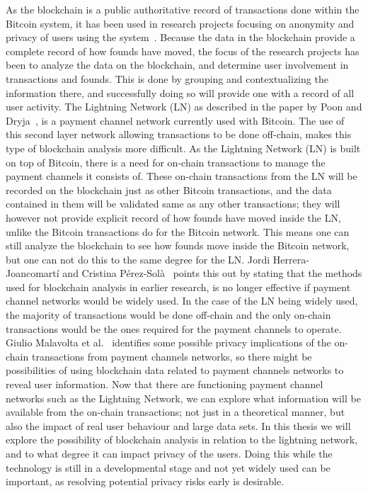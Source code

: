 As the blockchain is a public authoritative record of transactions done within the Bitcoin system, it has been used in research projects focusing on anonymity and privacy of users using the system~\cite{reid2013analysis,meiklejohn2013fistful}. Because the data in the blockchain provide a complete record of how founds have moved, the focus of the research projects has been to analyze the data on the blockchain, and determine user involvement in transactions and founds. This is done by grouping and contextualizing the information there, and successfully doing so will provide one with a record of all user activity. 
The Lightning Network (LN) as described in the paper by Poon and Dryja~\cite{poon2015bitcoin}, is a payment channel network currently used with Bitcoin. The use of this second layer network allowing transactions to be done off-chain, makes this type of blockchain analysis more difficult. As the Lightning Network (LN) is built on top of Bitcoin, there is a need for on-chain transactions to manage the payment channels it consists of. These on-chain transactions from the LN will be recorded on the blockchain just as other Bitcoin transactions, and the data contained in them will be validated same as any other transactions; they will however not provide explicit record of how founds have moved inside the LN, unlike the Bitcoin transactions do for the Bitcoin network.
This means one can still analyze the blockchain to see how founds move inside the Bitcoin network, but one can not do this to the same degree for the LN. Jordi Herrera-Joancomartí and Cristina Pérez-Solà~\cite{herrera2015research} points this out by stating that the methods used for blockchain analysis in earlier research, is no longer effective if payment channel networks would be widely used. In the case of the LN being widely used, the majority of transactions would be done off-chain and the only on-chain transactions would be the ones required for the payment channels to operate. Giulio Malavolta et al.~\cite{malavolta2017concurrency} identifies some possible privacy implications of the on-chain transactions from payment channels networks, so there might be possibilities of using blockchain data related to payment channels networks to reveal user information. Now that there are functioning payment channel networks such as the Lightning Network, we can explore what information will be available from the on-chain transactions; not just in a theoretical manner, but also the impact of real user behaviour and large data sets. In this thesis we will explore the possibility of blockchain analysis in relation to the lightning network, and to what degree it can impact privacy of the users. Doing this while the technology is still in a developmental stage and not yet widely used can be important, as resolving potential privacy risks early is desirable.
\\


